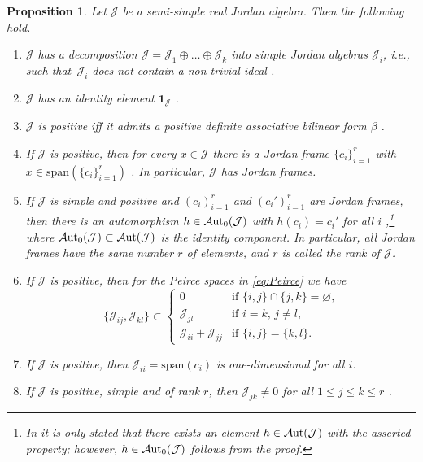 \documentclass[pdftex]{sigma}
\numberwithin{equation}{section}
\newtheorem{Proposition}[Theorem]{Proposition}
 { \theoremstyle{definition}
\newtheorem{Definition}[Theorem]{Definition}
\newtheorem{Note}[Theorem]{Note}
\newtheorem{Example}[Theorem]{Example}
\newtheorem{Remark}[Theorem]{Remark} }
\newcommand{\Aut}{\mathcal{A}{\rm ut}}
\newcommand{\Jcal}{\mathcal{J}}
\newcommand{\sspan}{{\mathrm{span}}}
\begin{document}
\begin{Proposition} \label{prop:collect-positive-Jordan} Let $\Jcal$ be a semi-simple real Jordan algebra. Then the following hold.
\begin{enumerate}\itemsep=0pt
\item[$(1)$]%
$\Jcal$ has a decomposition $\Jcal = \Jcal_1 \oplus \dots \oplus \Jcal_k$ into {\em simple }Jordan algebras $\Jcal_i$, i.e., such that~$\Jcal_i$ does not contain a non-trivial ideal {\rm \cite[Theorem III.11]{Koecher-1999}}.
\item[$(2)$]
$\Jcal$ has an identity element $\mathbf{1}_\Jcal$ {\rm \cite[Theorem III.9]{Koecher-1999}}.%
\item[$(3)$] $\Jcal$ is positive iff it admits a positive definite associative bilinear form $\beta$ {\rm \cite[p.~61]{F-K-1994}}.%
\item[$(4)$]
If $\Jcal$ is positive, then for every $x \in \Jcal$ there is a Jordan frame $\{c_i\}_{i=1}^r$ with $x \in \sspan(\{c_i\}_{i=1}^r)$ {\rm \cite[Theorem III.1.2]{F-K-1994}}. In particular, $\Jcal$ has Jordan frames.%
\item[$(5)$]
If $\Jcal$ is simple and positive and $(c_i)_{i=1}^r$ and $(c_i')_{i=1}^r$ are Jordan frames, then there is an automorphism $h \in \Aut_0(\Jcal)$ with $h(c_i) = c_i'$ for all $i$ {\rm \cite[Theorem IV.2.5]{F-K-1994}},\footnote{In {\rm \cite{F-K-1994}} it is only stated that there exists an element $h \in \Aut(\Jcal)$ with the asserted property; however, $h \in \Aut_0(\Jcal)$ follows from the proof.} where $\Aut_0(\Jcal) \subset \Aut(\Jcal)$ is the identity component. In particular, all Jordan frames have the same number $r$ of elements, and $r$ is called the {\em rank of $\Jcal$}.%
\item[$(6)$]
If $\Jcal$ is positive, then for the Peirce spaces in \eqref{eq:Peirce} we have {\rm \cite[Theorem IV.2.1]{F-K-1994}}%
\[
\{\Jcal_{ij}, \Jcal_{kl}\} \subset \begin{cases} 0 & \text{if $\{i,j\} \cap \{j,k\} = \varnothing$,}\\
\Jcal_{jl} & \text{if $i=k$, $j \neq l$},\\
\Jcal_{ii} + \Jcal_{jj} & \text{if $\{i,j\} = \{k,l\}$}. \end{cases}
\]
\item[$(7)$]
If $\Jcal$ is positive, then $\Jcal_{ii} = \sspan(c_i)$ is one-dimensional for all $i$.%
\item[$(8)$]
{If $\Jcal$ is positive, simple and of rank $r$, then $\Jcal_{jk} \neq 0$ for all $1\leq j\leq k\leq r$ {\rm \cite[Theorem~IV.2.3]{F-K-1994}}.}%
\end{enumerate}
\end{Proposition}
\end{document}
